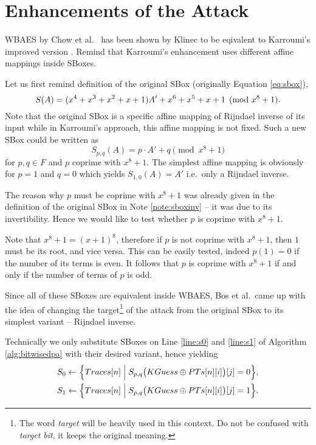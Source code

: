 \section{Enhancements of the Attack}   %

WBAES by Chow et al.\ \cite{chow2003aes} has been shown by Klinec \cite{klinec2013white} to be eqivalent to Karroumi's improved version \cite{karroumi2011protecting}. Remind that Karroumi's enhancement uses different affine mappings inside SBoxes. %

Let us first remind definition of the original SBox (originally Equation \ref{eq:sbox}),
\[
	S(A) = (x^4 + x^3 + x^2 + x + 1)A' + x^6 + x^5 + x + 1 \pmod{x^8+1} .
\]
Note that the original SBox is a specific affine mapping of Rijndael inverse of its input while in Karroumi's approach, this affine mapping is not fixed. Such a new SBox could be written as
\begin{equation}
	S_{p,q}(A) = p\cdot A' + q \pmod{x^8+1}
\end{equation}
for $p,q\in F$ and $p$ coprime with $x^8+1$. The simplest affine mapping is obviously for $p=1$ and $q=0$ which yields $S_{1,0}(A) = A'$ i.e.\ only a Rijndael inverse.

\begin{remark}
\label{rem:coprime}
	The reason why $p$ must be coprime with $x^8+1$ was already given in the definition of the original SBox in Note \ref{note:sboxinv} -- it was due to its invertibility. Hence we would like to test whether $p$ is coprime with $x^8+1$.
	
	Note that $x^8+1 = (x+1)^8$, therefore if $p$ is not coprime with $x^8+1$, then $1$ must be its root, and vice versa. This can be easily tested, indeed $p(1) = 0$ if the number of its terms is even. It follows that $p$ is coprime with $x^8+1$ if and only if the number of terms of $p$ is odd.
\end{remark}

Since all of these SBoxes are equivalent inside WBAES, Bos et al.\ came up with the idea of changing the target\footnote{The word {\em target} will be heavily used in this context. Do not be confused with {\em target bit}, it keeps the original meaning.} of the attack from the original SBox to its simplest variant -- Rijndael inverse.

\begin{remark}
	Technically we only substitute SBoxes on Line \ref{line:s0} and \ref{line:s1} of Algorithm \ref{alg:bitwisedpa} with their desired variant, hence yielding
	\begin{align*}
		S_0 &\gets \Bigl\{ Traces[n] \Bigm| S_{p,q}\bigl(KGuess\oplus PTs[n][i]\bigr)[j] = 0 \Bigr\} , \\
		S_1 &\gets \Bigl\{ Traces[n] \Bigm| S_{p,q}\bigl(KGuess\oplus PTs[n][i]\bigr)[j] = 1 \Bigr\} .
	\end{align*}
\end{remark}

